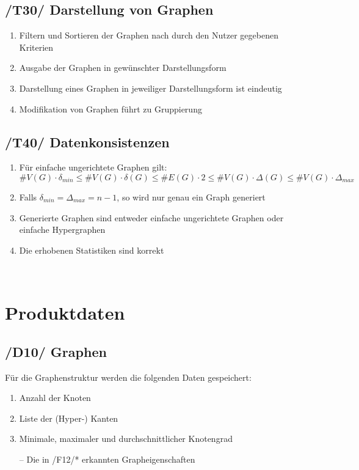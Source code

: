 \documentclass{article}
\begin{document}
	\subsection*{/T30/ Darstellung von Graphen} \label{t30} 
	\begin{enumerate}[--]
		\item{Filtern und Sortieren der Graphen nach durch den Nutzer gegebenen Kriterien}
		\item{Ausgabe der Graphen in gewünschter Darstellungsform}
		\item{Darstellung eines Graphen in jeweiliger Darstellungsform ist eindeutig}
		\item{Modifikation von Graphen führt zu Gruppierung}
	\end{enumerate}
	
	\subsection*{/T40/ Datenkonsistenzen} \label{t40} 
	\begin{enumerate}[--]
		\item{Für einfache ungerichtete Graphen gilt: $$\#V(G) \cdot \delta_{min} \leq \#V(G) \cdot \delta(G) \leq \#E(G) \cdot 2 \leq \#V(G) \cdot \Delta(G) \leq \#V(G) \cdot \Delta_{max}$$}
		\item{Falls $\delta_{min} = \Delta_{max} = n-1$, so wird nur genau ein Graph generiert}
		\item{Generierte Graphen sind entweder einfache ungerichtete Graphen oder einfache Hypergraphen}
		\item{Die erhobenen Statistiken sind korrekt}
	\end{enumerate}
	
	
	~\newpage
	\section{Produktdaten}
	\subsection*{/D10/ Graphen} \label{d10} 
	Für die Graphenstruktur werden die folgenden Daten gespeichert:
	\begin{enumerate}[--]
		\item{Anzahl der Knoten}
		\item{Liste der (Hyper-) Kanten}
		\item{Minimale, maximaler und durchschnittlicher Knotengrad}
		\item[--]{Die in /F12/* erkannten Grapheigenschaften}
	\end{enumerate}
	
\end{document}
